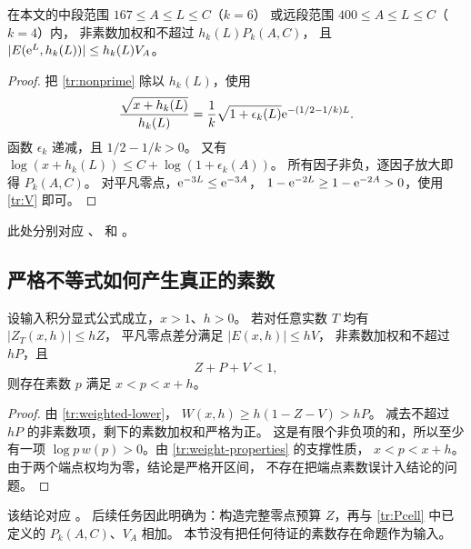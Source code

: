 \begin{lemma}[单元内的统一小项界]\label{tr:cell-small}
在本文的中段范围 $167\leq A\leq L\leq C$（$k=6$）
或远段范围 $400\leq A\leq L\leq C$（$k=4$）内，
非素数加权和不超过 $h_k(L)P_k(A,C)$，
且 $|E(\mathrm e^L,h_k(L))|\leq h_k(L)V_A$。
\end{lemma}
\begin{proof}
把 \eqref{tr:nonprime} 除以 $h_k(L)$，使用
\[
 \frac{\sqrt{x+h_k(L)}}{h_k(L)}
 =\frac1k\sqrt{1+\epsilon_k(L)}
           \mathrm e^{-(1/2-1/k)L}.
\]
函数 $\epsilon_k$ 递减，且 $1/2-1/k>0$。
又有
$\log(x+h_k(L))\leq C+\log(1+\epsilon_k(A))$。
所有因子非负，逐因子放大即得 $P_k(A,C)$。
对平凡零点，$\mathrm e^{-3L}\leq\mathrm e^{-3A}$，
$1-\mathrm e^{-2L}\geq1-\mathrm e^{-2A}>0$，使用 \eqref{tr:V} 即可。
\end{proof}
此处分别对应
、
和 。

\subsection{严格不等式如何产生真正的素数}

\begin{proposition}[三项预算判据]\label{tr:prime-criterion}
设输入积分显式公式成立，$x>1$、$h>0$。
若对任意实数 $T$ 均有 $|Z_T(x,h)|\leq hZ$，
平凡零点差分满足 $|E(x,h)|\leq hV$，
非素数加权和不超过 $hP$，且
\begin{equation}\label{tr:criterion}
 Z+P+V<1,
\end{equation}
则存在素数 $p$ 满足 $x<p<x+h$。
\end{proposition}
\begin{proof}
由 \eqref{tr:weighted-lower}，
$W(x,h)\geq h(1-Z-V)>hP$。
减去不超过 $hP$ 的非素数项，剩下的素数加权和严格为正。
这是有限个非负项的和，所以至少有一项
$\log p\,w(p)>0$。由 \eqref{tr:weight-properties} 的支撑性质，
$x<p<x+h$。由于两个端点权均为零，结论是严格开区间，
不存在把端点素数误计入结论的问题。
\end{proof}
该结论对应 。
后续任务因此明确为：构造完整零点预算 $Z$，再与
\eqref{tr:Pcell} 中已定义的 $P_k(A,C)$、$V_A$ 相加。
本节没有把任何待证的素数存在命题作为输入。
